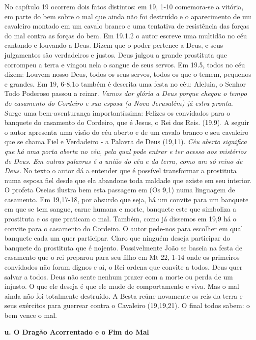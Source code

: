 \documentclass[
]{book}
\begin{document}
No capítulo 19 ocorrem dois fatos distintos: em 19, 1-10 comemora-se a vitória, em parte do bem sobre o mal que ainda não foi destruído e o aparecimento de um cavaleiro montado em um cavalo branco e uma tentativa de resistência das forças do mal contra as forças do bem. Em 19.1.2 o autor escreve uma multidão no céu cantando e louvando a Deus. Dizem que o poder pertence a Deus, e seus julgamentos são verdadeiros e justos. Deus julgou a grande prostituta que corrompeu a terra e vingou nela o sangue de seus servos. Em 19.5, todos no céu dizem: Louvem nosso Deus, todos os seus servos, todos os que o temem, pequenos e grandes. Em 19, 6-8,1o também é descrita uma festa no céu: Aleluia, o Senhor Todo Poderoso passou a reinar. \emph{Vamos dar glória a Deus porque chegou o tempo do casamento do Cordeiro e sua esposa (a Nova Jerusalém) já estra pronta}. Surge uma bem-aventurança importantíssima: Felizes os convidados para o banquete do casamento do Cordeiro, que é Jesus, o Rei dos Reis. (19,9). A seguir o autor apresenta uma visão do céu aberto e de um cavalo branco e seu cavaleiro que se chama Fiel e Verdadeiro - a Palavra de Deus (19,11). \emph{Céu aberto significa que há uma porta aberta no céu, pela qual pode entrar e ter acesso aos mistérios de Deus. Em outras palavras é a união do céu e da terra, como um só reino de Deus}. No texto o autor dá a entender que é possível transformar a prostituta numa esposa fiel desde que ela abandone toda maldade que existe em seu interior. O profeta Oseias ilustra bem esta passagem em (Os 9,1) numa linguagem de casamento. Em 19,17-18, por absurdo que seja, há um convite para um banquete em que se tem sangue, carne humana e morte, banquete este que simboliza a prostituta e os que praticam o mal. Também, como já dissemos em 19,9 há o convite para o casamento do Cordeiro. O autor pede-nos para escolher em qual banquete cada um quer participar. Claro que ninguém deseja participar do banquete da prostituta que é nojento. Possivelmente João se baseia na festa de casamento que o rei preparou para seu filho em Mt 22, 1-14 onde os primeiros convidados não foram dignos e aí, o Rei ordena que convite a todos. Deus quer salvar a todos. Deus não sente nenhum prazer com a morte ou perda de um injusto. O que ele deseja é que ele mude de comportamento e viva. Mas o mal ainda não foi totalmente destruído. A Besta reúne novamente os reis da terra e seus exércitos para guerrear contra o Cavaleiro (19,19,21). O final todos sabem: o bem vence o mal.

\textbf{u. O Dragão Acorrentado e o Fim do Mal}
\end{document}
